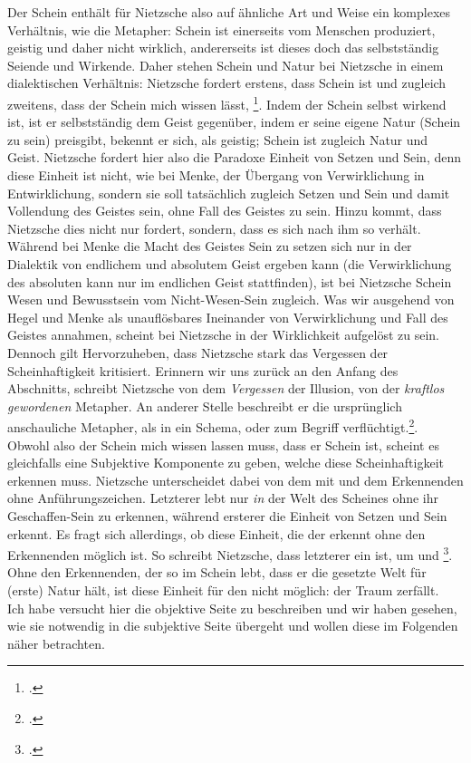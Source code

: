 \documentclass[12pt, a4paper, openany]{report}
\begin{document}
Der Schein enthält für Nietzsche also auf ähnliche Art und Weise ein komplexes Verhältnis, wie die Metapher: 
Schein ist einerseits vom Menschen produziert, geistig und daher nicht wirklich, andererseits ist dieses doch das selbstständig Seiende und Wirkende.
Daher stehen Schein und Natur bei Nietzsche in einem dialektischen Verhältnis:
Nietzsche fordert erstens, dass Schein  ist und zugleich zweitens, dass der Schein mich wissen lässt, \footcite[][417]{nietzsche_morgenrote_1999}.
Indem der Schein selbst wirkend ist, ist er selbstständig dem Geist gegenüber, indem er seine eigene Natur (Schein zu sein) preisgibt, bekennt er sich, als geistig;
Schein ist zugleich Natur und Geist.
Nietzsche fordert hier also die Paradoxe Einheit von Setzen und Sein, denn diese Einheit ist nicht, wie bei Menke, der Übergang von Verwirklichung in Entwirklichung, sondern sie soll tatsächlich zugleich Setzen und Sein und damit Vollendung des Geistes sein, ohne Fall des Geistes zu sein.
Hinzu kommt, dass Nietzsche dies nicht nur fordert, sondern, dass es sich nach ihm so verhält.
Während bei Menke die Macht des Geistes Sein zu setzen sich nur in der Dialektik von endlichem und absolutem Geist ergeben kann (die Verwirklichung des absoluten kann nur im endlichen Geist stattfinden), ist bei Nietzsche Schein Wesen und Bewusstsein vom Nicht-Wesen-Sein zugleich.
Was wir ausgehend von Hegel und Menke als unauflösbares Ineinander von Verwirklichung und Fall des Geistes annahmen, scheint bei Nietzsche in der Wirklichkeit aufgelöst zu sein. 
Dennoch gilt Hervorzuheben, dass Nietzsche stark das Vergessen der Scheinhaftigkeit kritisiert. 
Erinnern wir uns zurück an den Anfang des Abschnitts, schreibt Nietzsche von dem \emph{Vergessen} der Illusion, von der \emph{kraftlos gewordenen} Metapher. 
An anderer Stelle beschreibt er die ursprünglich anschauliche Metapher, als in ein Schema, oder zum Begriff verflüchtigt.\footcite[Vgl.][881]{nietzsche_geburt_1999}.
Obwohl also der Schein mich wissen lassen muss, dass er Schein ist, scheint es gleichfalls eine Subjektive Komponente zu geben, welche diese Scheinhaftigkeit erkennen muss.
Nietzsche unterscheidet dabei von dem  mit und dem Erkennenden ohne Anführungszeichen. 
Letzterer lebt nur \emph{in} der Welt des Scheines ohne ihr Geschaffen-Sein zu erkennen, während ersterer die Einheit von Setzen und Sein erkennt. 
Es fragt sich allerdings, ob diese Einheit, die der  erkennt ohne den Erkennenden möglich ist.
So schreibt Nietzsche, dass letzterer ein  ist, um  und \footcite[][§ 54, S. 417]{nietzsche_morgenrote_1999}.
Ohne den Erkennenden, der so im Schein lebt, dass er die gesetzte Welt für (erste) Natur hält, ist diese Einheit für den  nicht möglich: der Traum zerfällt.\\
Ich habe versucht hier die objektive Seite zu beschreiben und wir haben gesehen, wie sie notwendig in die subjektive Seite übergeht und wollen diese im Folgenden näher betrachten.
\end{document}
